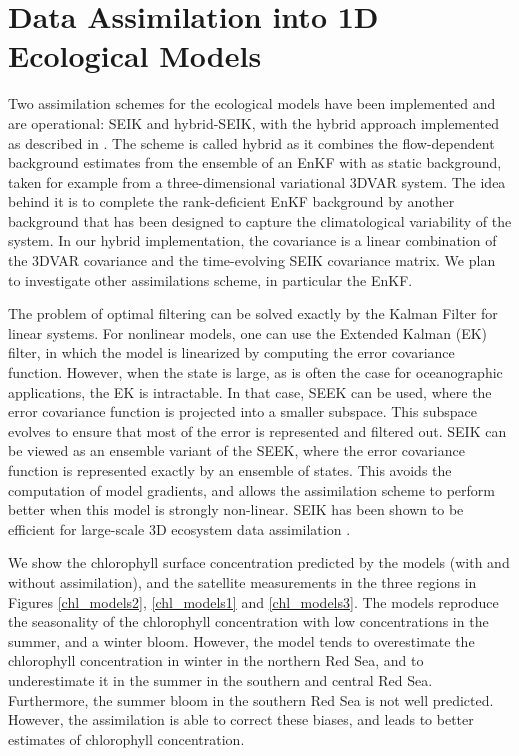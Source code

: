 \section{Data Assimilation into 1D Ecological Models}

Two assimilation schemes for the ecological models have been implemented and
are operational: SEIK and hybrid-SEIK, with the hybrid approach implemented as
described in \citet{Hamill2000}. The scheme is called hybrid as it combines the
flow-dependent background estimates from the ensemble of an EnKF with as static
background, taken for example from a three-dimensional variational 3DVAR
system. The idea behind it is to complete the rank-deficient EnKF background by
another background that has been designed to capture the climatological
variability of the system.  In our hybrid implementation, the covariance is a
linear combination of the 3DVAR covariance and the time-evolving SEIK
covariance matrix. We plan to investigate other assimilations scheme, in
particular the EnKF.

The problem of optimal filtering can be solved exactly by the Kalman Filter for
linear systems. For nonlinear models, one can use the Extended Kalman (EK)
filter, in which the model is linearized by computing the error covariance
function.  However, when the state is large, as is often the case for
oceanographic applications, the EK is intractable. In that case, SEEK can be
used, where the error covariance function is projected into a smaller subspace.
This subspace evolves to ensure that most of the error is represented and
filtered out. SEIK can be viewed as an ensemble variant of the SEEK, where the
error covariance function is represented exactly by an ensemble of states. This
avoids the computation of model gradients, and allows the assimilation scheme
to perform better when this model is strongly non-linear. SEIK has been shown
to be efficient for large-scale 3D ecosystem data assimilation
\citep{Triantafyllou2003}.

We show the chlorophyll surface concentration predicted by the models (with and
without assimilation), and the satellite measurements in the three regions in
Figures \ref{chl_models2}, \ref{chl_models1} and \ref{chl_models3}.  The models
reproduce the seasonality of the chlorophyll concentration with low
concentrations in the summer, and a winter bloom. However, the model tends to
overestimate the chlorophyll concentration in winter in the northern Red Sea,
and to underestimate it in the summer in the southern and central Red Sea.
Furthermore, the summer bloom in the southern Red Sea is not well predicted.
However, the assimilation is able to correct these biases, and leads to better
estimates of chlorophyll concentration.

